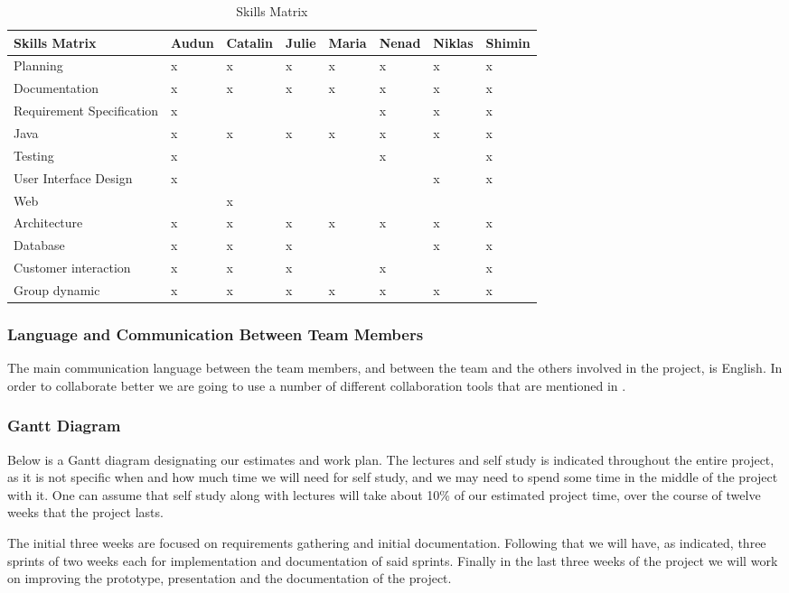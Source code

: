 \documentclass[../document.tex]{subfiles}
\begin{document}
\begin{table}[H]
\caption{Skills Matrix}
\begin{tabularx}{\textwidth}{|L{2.2cm}|X|X|L{.7cm}|X|X|X|X|}
\hline
Skills Matrix
&Audun
&Catalin
&Julie
&Maria
&Nenad
&Niklas
&Shimin
\\ \hline Planning
&x
&x
&x
&x
&x
&x
&x
\\ \hline Documentation
&x
&x
&x
&x
&x
&x
&x
\\ \hline Requirement Specification
&x
&
&
&
&x
&x
&x
\\ \hline \gls{Java}
&x
&x
&x
&x
&x
&x
&x
\\ \hline Testing
&x
&
&
&
&x
&
&x
\\ \hline User Interface Design
&x
&
&
&
&
&x
&x
\\ \hline Web
&
&x
&
&
&
&
&
\\ \hline Architecture
&x
&x
&x
&x
&x
&x
&x
\\ \hline Database
&x
&x
&x
&
&
&x
&x
\\ \hline Customer interaction
&x
&x
&x
&
&x
&
&x
\\ \hline Group dynamic
&x
&x
&x
&x
&x
&x
&x
\\ \hline
\end{tabularx}
\end{table}

\subsubsection{Language and Communication Between Team Members}
The main communication language between the team members, and between the team and the others involved in the project, is English. In order to collaborate better we are going to use a number of different collaboration tools that are mentioned in .


\subsubsection{Gantt Diagram}
Below is a Gantt diagram designating our estimates and work plan. The lectures and self study is indicated throughout the entire project, as it is not specific when and how much time we will need for self study, and we may need to spend some time in the middle of the project with it. One can assume that self study along with lectures will take about 10\% of our estimated project time, over the course of twelve weeks that the project lasts.

The initial three weeks are focused on requirements gathering and initial documentation. Following that we will have, as indicated, three sprints of two weeks each for implementation and documentation of said sprints. Finally in the last three weeks of the project we will work on improving the prototype, presentation and the documentation of the project.
\end{document}
